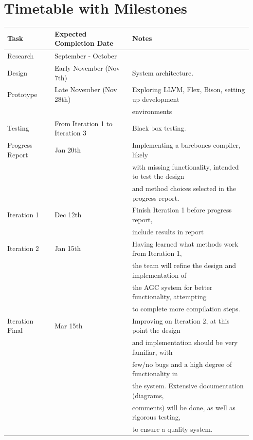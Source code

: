 \documentclass[11pt]{article}
\begin{document}
\pagebreak

\section{Timetable with Milestones}

\begin{center}
\begin{tabular}{ |l | l | l|  }
 \hline
 \textbf{Task} & \textbf{Expected Completion Date} & \textbf{Notes} \\
 \hline 
 Research & September - October &  \\
 \hline 
 Design & Early November (Nov 7th)  & System architecture. \\
 \hline
 Prototype & Late November (Nov 28th) & Exploring LLVM, Flex, Bison, setting up development \\
 	    & & environments \\
 \hline
 Testing & From Iteration 1 to Iteration 3 & Black box testing. \\
 \hline
 Progress Report & Jan 20th & Implementing a barebones compiler, likely\\
 		 & & with missing functionality, intended to test the design \\
 		 & & and method choices selected in the progress report.\\
 \hline
 Iteration 1 & Dec 12th  & Finish Iteration 1 before progress report, \\
 		 & & include results in report\\
 \hline
 Iteration 2 & Jan 15th & Having learned what methods work from Iteration 1, \\
 		 & & the team will refine the design and implementation of \\ 		             		 & & the AGC system for better functionality, attempting \\
 		 & & to complete more compilation steps.\\
 \hline
 Iteration Final & Mar 15th & Improving on Iteration 2, at this point the design\\
 		 & & and implementation should be very familiar, with\\
 		 & & few/no bugs and a high degree of functionality in \\
 		 & & the system. Extensive documentation (diagrams, \\
 		 & & comments) will be done, as well as rigorous testing, \\
 		 & & to ensure a quality system.\\
 \hline
\end{tabular}
\end{center}
\end{document}
